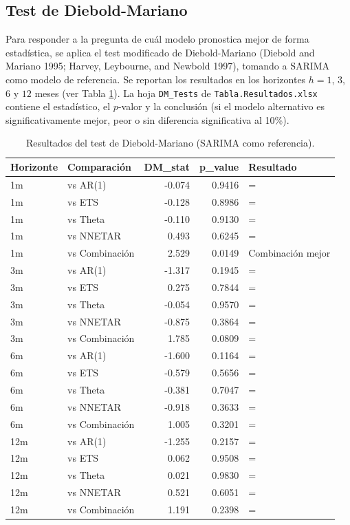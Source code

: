 \documentclass[
  12pt, a4paper, oneside]{article}
\begin{document}
\subsection{Test de Diebold-Mariano}\label{test-de-diebold-mariano-1}

Para responder a la pregunta de cuál modelo pronostica mejor de forma estadística, se aplica el test modificado de Diebold-Mariano (Diebold and Mariano 1995; Harvey, Leybourne, and Newbold 1997), tomando a SARIMA como modelo de referencia. Se reportan los resultados en los horizontes \(h = 1\), \(3\), \(6\) y \(12\) meses (ver Tabla \ref{tab:tab-dm}). La hoja \texttt{DM\_Tests} de \texttt{Tabla.Resultados.xlsx} contiene el estadístico, el \(p\)-valor y la conclusión (si el modelo alternativo es significativamente mejor, peor o sin diferencia significativa al 10\%).

\begin{table}

\caption{\label{tab:tab-dm}Resultados del test de Diebold-Mariano (SARIMA como referencia).}
\centering
\begin{tabular}[t]{llrrl}
\toprule
Horizonte & Comparación & DM\_stat & p\_value & Resultado\\
\midrule
1m & vs AR(1) & -0.074 & 0.9416 & =\\
1m & vs ETS & -0.128 & 0.8986 & =\\
1m & vs Theta & -0.110 & 0.9130 & =\\
1m & vs NNETAR & 0.493 & 0.6245 & =\\
1m & vs Combinación & 2.529 & 0.0149 & Combinación mejor\\
\addlinespace
3m & vs AR(1) & -1.317 & 0.1945 & =\\
3m & vs ETS & 0.275 & 0.7844 & =\\
3m & vs Theta & -0.054 & 0.9570 & =\\
3m & vs NNETAR & -0.875 & 0.3864 & =\\
3m & vs Combinación & 1.785 & 0.0809 & =\\
\addlinespace
6m & vs AR(1) & -1.600 & 0.1164 & =\\
6m & vs ETS & -0.579 & 0.5656 & =\\
6m & vs Theta & -0.381 & 0.7047 & =\\
6m & vs NNETAR & -0.918 & 0.3633 & =\\
6m & vs Combinación & 1.005 & 0.3201 & =\\
\addlinespace
12m & vs AR(1) & -1.255 & 0.2157 & =\\
12m & vs ETS & 0.062 & 0.9508 & =\\
12m & vs Theta & 0.021 & 0.9830 & =\\
12m & vs NNETAR & 0.521 & 0.6051 & =\\
12m & vs Combinación & 1.191 & 0.2398 & =\\
\bottomrule
\end{tabular}
\end{table}
\end{document}
